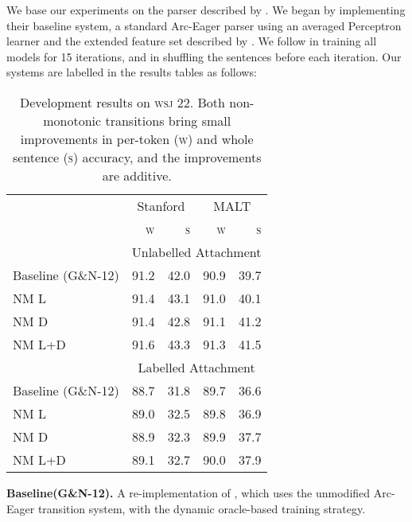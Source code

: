 \documentclass[11pt,letterpaper]{article}
\newcommand{\wsj}{\textsc{wsj}\xspace}
\begin{document}
We base our experiments on the parser described by \citet{goldberg:12}. We
began by implementing their baseline system, a standard Arc-Eager parser using
an averaged Perceptron learner and the extended feature set described by \citet{zhang:11}.
We follow \citet{goldberg:12} in training all models for 15 iterations,
and in shuffling the sentences before each iteration.
Our systems are labelled in the results tables as follows:

\begin{table}[t]
    \small
    \centering
    \begin{tabular}{l|rrrr}
        \hline
        & \multicolumn{2}{c}{Stanford} & \multicolumn{2}{c}{MALT}  \\
        & \textsc{w}  & \textsc{s} & \textsc{w} & \textsc{s} \\
        \hline \hline
        & \multicolumn{4}{c}{Unlabelled Attachment} \\
        \hline
        Baseline (G\&N-12) & 91.2 & 42.0 & 90.9 & 39.7 \\
        NM L & 91.4 & 43.1 & 91.0 & 40.1 \\
        NM D & 91.4 & 42.8 & 91.1 & 41.2 \\
        NM L+D & 91.6 & 43.3 & 91.3 & 41.5 \\
        \hline
        & \multicolumn{4}{c}{Labelled Attachment} \\
        \hline
        Baseline (G\&N-12)& 88.7 & 31.8 & 89.7 & 36.6 \\
        NM L & 89.0 & 32.5 & 89.8 & 36.9 \\
        NM D & 88.9 & 32.3 & 89.9 & 37.7 \\
        NM L+D & 89.1 & 32.7 & 90.0 & 37.9 \\
        \hline
    \end{tabular}
    \caption{\small
        Development results on \wsj 22. Both non-monotonic transitions
        bring small improvements in per-token (\textsc{w}) and whole sentence (\textsc{s})
        accuracy, and the improvements are additive.
        \label{tab:goldberg}}
\end{table}


\noindent \textbf{Baseline(G\&N-12).}
A re-implementation of \citep{goldberg:12}, which uses the
unmodified Arc-Eager transition
system, with the dynamic oracle-based training strategy.
\end{document}
